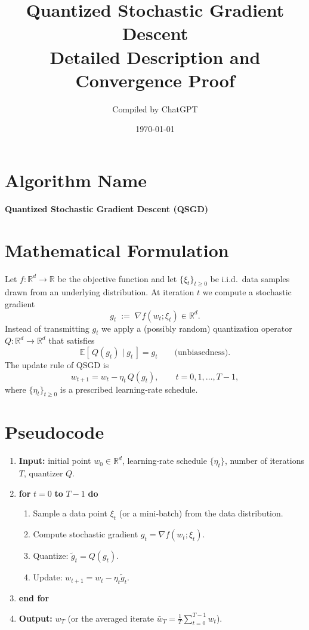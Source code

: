 \documentclass{article}
\newcommand{\EE}{\mathbb{E}}
\newcommand{\RR}{\mathbb{R}}
\begin{document}
\title{Quantized Stochastic Gradient Descent \\ Detailed Description and Convergence Proof}
\author{Compiled by ChatGPT}
\date{\today}
\maketitle

\tableofcontents

\newpage

\section*{Algorithm Name}
\begin{center}
\Large \textbf{Quantized Stochastic Gradient Descent (QSGD)}
\end{center}

\section*{Mathematical Formulation}
Let $f:\RR^{d}\rightarrow\RR$ be the objective function and let $\{\xi_t\}_{t\ge 0}$ be i.i.d.\ data samples drawn from an underlying distribution.  
At iteration $t$ we compute a stochastic gradient
\[
g_t \;:=\; \nabla f(w_t;\xi_t)\in\RR^{d}.
\]
Instead of transmitting $g_t$ we apply a (possibly random) quantization operator $Q:\RR^{d}\rightarrow\RR^{d}$ that satisfies
\[
\EE[\,Q(g_t)\mid g_t\,]=g_t\qquad\text{(unbiasedness)}. \tag{1}
\]
The update rule of QSGD is
\[
w_{t+1}=w_t-\eta_t\,Q(g_t), \qquad t=0,1,\dots,T-1, \tag{2}
\]
where $\{\eta_t\}_{t\ge 0}$ is a prescribed learning‑rate schedule.

\section*{Pseudocode}
\begin{enumerate}[label=Step \arabic*:, leftmargin=*, itemsep=0pt]
\item \textbf{Input:} initial point $w_0\in\RR^{d}$, learning‑rate schedule $\{\eta_t\}$, number of iterations $T$, quantizer $Q$.
\item \textbf{for} $t=0$ \textbf{to} $T-1$ \textbf{do}
   \begin{enumerate}[label=\arabic*., leftmargin=*, itemsep=0pt]
   \item Sample a data point $\xi_t$ (or a mini‑batch) from the data distribution.
   \item Compute stochastic gradient $g_t=\nabla f(w_t;\xi_t)$.
   \item Quantize: $\tilde g_t = Q(g_t)$.
   \item Update: $w_{t+1}=w_t-\eta_t\tilde g_t$.
   \end{enumerate}
\item \textbf{end for}
\item \textbf{Output:} $w_T$ (or the averaged iterate $\bar w_T=\frac{1}{T}\sum_{t=0}^{T-1}w_t$).
\end{enumerate}
\end{document}
